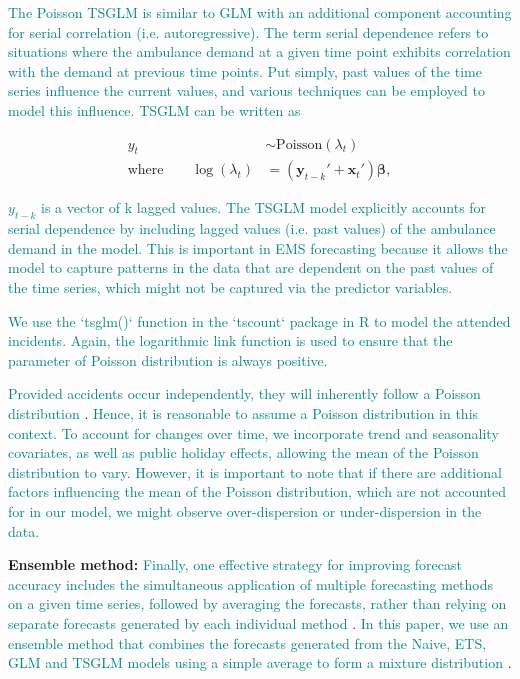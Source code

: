 \documentclass[
  authoryear,
  preprint,
  3p]{elsarticle}
\begin{document}
\textcolor{teal}{The Poisson TSGLM is similar to GLM with an additional component accounting for serial correlation (i.e. autoregressive). The term serial dependence refers to situations where the ambulance demand at a given time point exhibits correlation with the demand at previous time points. Put simply, past values of the time series influence the current values, and various techniques can be employed to model this influence. TSGLM can be written as}

\begin{align*}
  y_t &\sim \text{Poisson}(\lambda_t) \\
  \text{where}\qquad
  \log(\lambda_t) &= (\bm{y}_{t-k}'+\bm{x}_t')\bm{\beta},
\end{align*}

\textcolor{teal}{${y}_{t-k}$ is a vector of k lagged values. The TSGLM model explicitly accounts for serial dependence by including lagged values (i.e. past values) of the ambulance demand in the model. This is important in EMS forecasting because it allows the model to capture patterns in the data that are dependent on the past values of the time series, which might not be captured via the predictor variables.}

\textcolor{teal}{We use the `tsglm()` function in the `tscount` package in R}
\citep{JSSv082i05}
\textcolor{teal}{to model the attended incidents. Again, the logarithmic link function is used to ensure that the parameter of Poisson distribution is always positive.}

\textcolor{teal}{Provided accidents occur independently, they will inherently follow a Poisson distribution}
\citep[p156-158]{feller1991introduction}.
\textcolor{teal}{Hence, it is reasonable to assume a Poisson distribution in this context. To account for changes over time, we incorporate trend and seasonality covariates, as well as public holiday effects, allowing the mean of the Poisson distribution to vary. However, it is important to note that if there are additional factors influencing the mean of the Poisson distribution, which are not accounted for in our model, we might observe over-dispersion or under-dispersion in the data.}

\textbf{Ensemble method:}
\textcolor{teal}{Finally, one effective strategy for improving forecast accuracy includes the simultaneous application of multiple forecasting methods on a given time series, followed by averaging the forecasts, rather than relying on separate forecasts generated by each individual method}
\citep{clemen1989combining}.
\textcolor{teal}{In this paper, we use an ensemble method that combines the forecasts generated from the Naive, ETS, GLM and TSGLM models using a simple average to form a mixture distribution}
\citep{combinations}.
\end{document}

